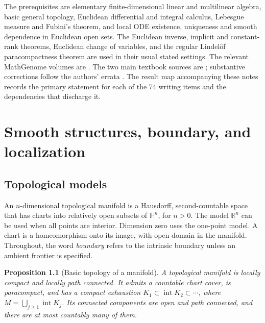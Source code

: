 \documentclass[11pt,oneside,openany]{book}
\newtheorem{proposition}[theorem]{Proposition}
\theoremstyle{definition}
\theoremstyle{remark}
\newcommand{\R}{\mathbb R}
\newcommand{\HH}{\mathbb H}
\begin{document}
The prerequisites are elementary finite-dimensional linear and multilinear algebra, basic general topology, Euclidean differential and integral calculus, Lebesgue measure and Fubini's theorem, and local ODE existence, uniqueness and smooth dependence in Euclidean open sets. The Euclidean inverse, implicit and constant-rank theorems, Euclidean change of variables, and the regular Lindel\"of paracompactness theorem are used in their usual stated settings. The relevant MathGenome volumes are \cite{d05,d10,d04,d11,d13}. The two main textbook sources are \cite{lee,tu}; substantive corrections follow the authors' errata \cite{leeerrata,tuerrata}. The result map accompanying these notes records the primary statement for each of the 74 writing items and the dependencies that discharge it.

{\small\tableofcontents}
\mainmatter
\chapter{Smooth structures, boundary, and localization}

\section{Topological models}

An \(n\)-dimensional topological manifold is a Hausdorff, second-countable
space that has charts into relatively open subsets of \(\HH^n\), for \(n>0\).
The model \(\R^n\) can be used when all points are interior. Dimension zero
uses the one-point model. A chart is a homeomorphism onto its image, with
open domain in the manifold. Throughout, the word \emph{boundary} refers to
the intrinsic boundary unless an ambient frontier is specified.

\begin{proposition}[Basic topology of a manifold]\label{p104:M01.01}
A topological manifold is locally compact and locally path connected.
It admits a countable chart cover, is paracompact, and has a compact
exhaustion \(K_1\subset\operatorname{int}K_2\subset\cdots\), where
\(M=\bigcup_{j\geq1}\operatorname{int}K_j\). Its connected components
are open and path connected, and there are at most countably many of them.
\end{proposition}
\end{document}

